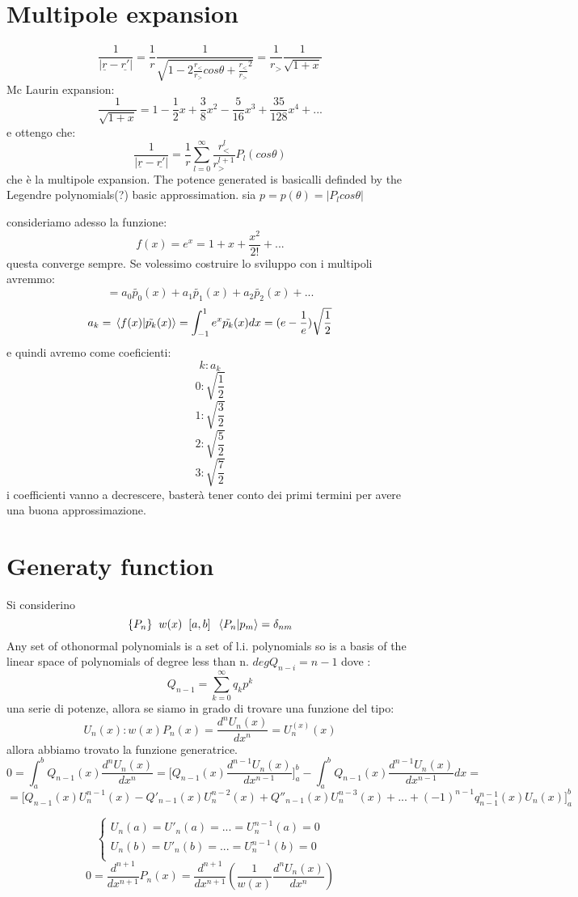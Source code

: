 \section{Multipole expansion}
\[\frac{1}{|\underline{r}-\underline{r'}|}=\frac{1}{r}\frac{1}{\sqrt{1-2\frac{r_<}{r_>}cos\theta+\frac{r_<}{r_>}^2}}=\frac{1}{r_>}\frac{1}{\sqrt{1+x}}\]
Mc Laurin expansion:
\[\frac{1}{\sqrt{1+x}}=1-\frac{1}{2}x+\frac{3}{8}x^2-\frac{5}{16}x^3+\frac{35}{128}x^4+...\] e ottengo che:
\[\frac{1}{|\underline{r}-\underline{r'}|}=\frac{1}{r}\sum_{l=0}^{\infty}\frac{r_<^l}{r_>^{l+1}}P_l(cos\theta)\] che è la multipole expansion.
The potence generated is basicalli definded by the Legendre polynomials(?) basic approssimation.
sia $p=p(\theta)=|P_l cos\theta|$

consideriamo adesso la funzione:
\[f(x)=e^{x}=1+x+\frac{x^2}{2!}+ ...\]
questa converge sempre. Se volessimo costruire lo sviluppo con i multipoli avremmo:
\[=a_0\tilde{p_0}(x)+a_1\tilde{p_1}(x)+a_2\tilde{p_2}(x)+...\]
\[a_k=\braket*{f(x)}{\tilde{p_k}(x)}=\int_{-1}^{1}e^x\tilde{p_k}(x)dx=(e-\frac{1}{e})\sqrt{\frac{1}{2}}\]
e quindi avremo come coeficienti:
\[k:a_k\]
\[0:\sqrt{\frac{1}{2}}\]
\[1: \sqrt{\frac{3}{2}}\]
\[2: \sqrt{\frac{5}{2}}\]
\[3: \sqrt{\frac{7}{2}}\]
i coefficienti vanno a decrescere, basterà tener conto dei primi termini per avere una buona approssimazione.

\section{Generaty function}
Si considerino \[\{P_n\} \;\; w(x)\;\; [a,b] \;\; \braket*{P_n}{p_m}=\delta_{nm}\]
Any set of othonormal polynomials is a set of l.i. polynomials so is a basis of the linear space of polynomials of degree less than n.
$degQ_{n-i}=n-1$ dove :
\[Q_{n-1}=\sum_{k=0}^{\infty}q_kp^k\] una serie di potenze, allora se siamo in grado di trovare una funzione del tipo:
\[U_n(x):w(x)P_n(x)=\frac{d^nU_n(x)}{dx^n}=U_n^{(x)}(x)\]
allora abbiamo trovato la funzione generatrice.
\[0=\int_{a}^{b}Q_{n-1}(x)\frac{d^nU_n(x)}{dx^n}=\big[Q_{n-1}(x)\frac{d^{n-1}U_n(x)}{dx^{n-1}}\big]^b_a-\int_{a}^{b}Q_{n-1}(x)\frac{d^{n-1}U_n(x)}{dx^{n-1}}dx=\]
\[= \big[ Q_{n-1}(x)U^{n-1}_n(x)-Q'_{n-1}(x)U^{n-2}_n(x)+Q''_{n-1}(x)U^{n-3}_n(x)+...+(-1)^{n-1}q^{n-1}_{n-1}(x)U_n(x)\big]_a^b\]

$$\begin{cases}
   U_n(a)=U'_n(a)=...=U_n^{n-1}(a)=0 \\
   U_n(b)=U'_n(b)=...=U_n^{n-1}(b)=0 \\
\end{cases}$$
\[0=\frac{d^{n+1}}{dx^{n+1}}P_n(x)=\frac{d^{n+1}}{dx^{n+1}}(\frac{1}{w(x)}\frac{d^nU_n(x)}{dx^n})\]


